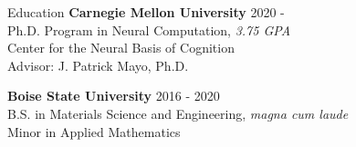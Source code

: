 \documentclass{resume} %
\begin{document}

\begin{rSection}{Education}
{\bf{Carnegie Mellon University}} \hfill {2020 -} \\ 
Ph.D. Program in Neural Computation, \textit{3.75 GPA} \\
Center for the Neural Basis of Cognition \\
Advisor: J. Patrick Mayo, Ph.D. \smallskip 

{\bf Boise State University} \hfill {2016 - 2020} \\ 
B.S. in Materials Science and Engineering, \textit{magna cum laude} \\
Minor in Applied Mathematics \smallskip

\end{rSection}

\end{document}
